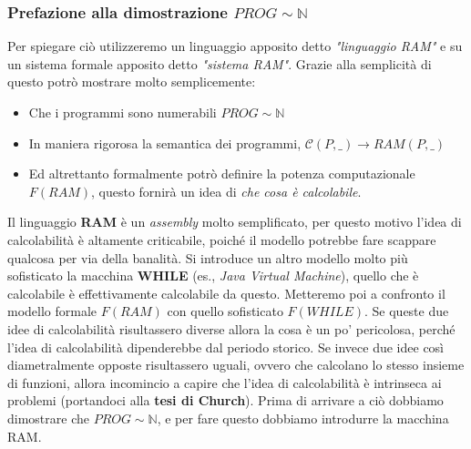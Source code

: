 \documentclass{article}
\begin{document}
\subsubsection{Prefazione alla dimostrazione $PROG\sim\mathbb{N}$}
Per spiegare ciò utilizzeremo un linguaggio apposito detto
\textit{"linguaggio RAM"} e su un sistema formale apposito detto \textit{"sistema RAM"}.
Grazie alla semplicità di questo potrò mostrare molto semplicemente:
\begin{itemize}
    \item Che i programmi sono numerabili $PROG\sim\mathbb{N}$
    \item In maniera rigorosa la semantica dei programmi, $\mathcal{C}(P,\_)\rightarrow RAM(P,\_)$
    \item Ed altrettanto formalmente potrò definire la potenza computazionale $F(RAM)$, questo fornirà
          un idea di \textit{che cosa è calcolabile}.
\end{itemize}
Il linguaggio \textbf{RAM} è un \textit{assembly} molto semplificato, per questo motivo l'idea di
calcolabilità è altamente criticabile, poiché il modello potrebbe fare scappare qualcosa
per via della banalità.
Si introduce un altro modello molto più sofisticato la macchina \textbf{WHILE} (es., \textit{Java Virtual Machine}), quello
che è calcolabile è effettivamente calcolabile da questo.
\newline\newline
Metteremo poi a confronto il modello formale $F(RAM)$ con quello sofisticato $F(WHILE)$. Se
queste due idee di calcolabilità risultassero diverse allora la cosa è un po'
pericolosa, perché l'idea di calcolabilità dipenderebbe dal periodo storico.
Se invece due idee così diametralmente opposte risultassero uguali, ovvero che calcolano
lo stesso insieme di funzioni, allora incomincio a capire che l'idea di calcolabilità è intrinseca
ai problemi (portandoci alla \textbf{tesi di Church}).
\newline\newline
Prima di arrivare a ciò dobbiamo dimostrare che $PROG\sim\mathbb{N}$, e per fare questo dobbiamo
introdurre la macchina RAM.
\end{document}
